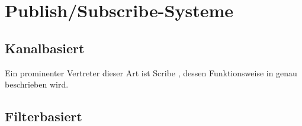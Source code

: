 \section{Publish/Subscribe-Systeme}
\label{chap:grundlagen:pubsub}

\cite{PatrickTh2003Many} %
\cite{Liu2003Survey}

\subsection{Kanalbasiert}
\label{chap:grundlagen:pubsub:kanalbasiert}
Ein prominenter Vertreter dieser Art ist Scribe \cite{Castro2002Scribe}, dessen Funktionsweise in  genau beschrieben wird.

\subsection{Filterbasiert}
\label{chap:grundlagen:pubsub:filterbased}
\cite{Bharambe2004Mercury} %

\cite{Demers2006Towards} %

\cite{Huebsch2003ContentBased}


